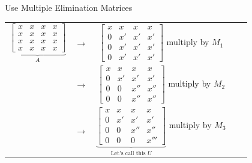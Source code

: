 \documentclass[10pt]{beamer}
\begin{document}
\begin{frame}[shrink]{Use Multiple Elimination Matrices}

\begin{center}
	\renewcommand{\arraystretch}{1.3}
	\footnotesize
	\begin{tabular}{ccccc}
		$\underbrace{\begin{bmatrix}\boxed{x} & x & x & x   \\
						   x  & x  & x  & x   \\
						   x  & x  & x  & x  \\
						   x  & x  & x  & x  \end{bmatrix}}_{A}$
		& $\longrightarrow$ &
		$\begin{bmatrix}\boxed{x} & x & x & x    \\
						   0  & x' & x' & x'  \\
						   0  & x' & x' & x'   \\
						   0  & x' & x' & x'  \end{bmatrix}$ multiply by $M_1$\\
        & $\longrightarrow$ &
		$\begin{bmatrix} x &   x        & x   & x     \\
						 0 & \boxed{x'} & x'  & x'   \\
						 0 &   0        & x'' & x''  \\
						 0 &   0        & x'' & x''  \end{bmatrix}$ multiply by $M_2$\\
        & $\longrightarrow$ &
		$\underbrace{\begin{bmatrix} x & x  &     x       & x     \\
						 0 & x' &     x'      & x'   \\
						 0 & 0  & \boxed{x''} & x''  \\
						 0 & 0  &     0       & x'''  \end{bmatrix}}_{\text{Let's call this $U$}}$ multiply by $M_3$
	\end{tabular}
\end{center}


\end{frame}

\end{document}
